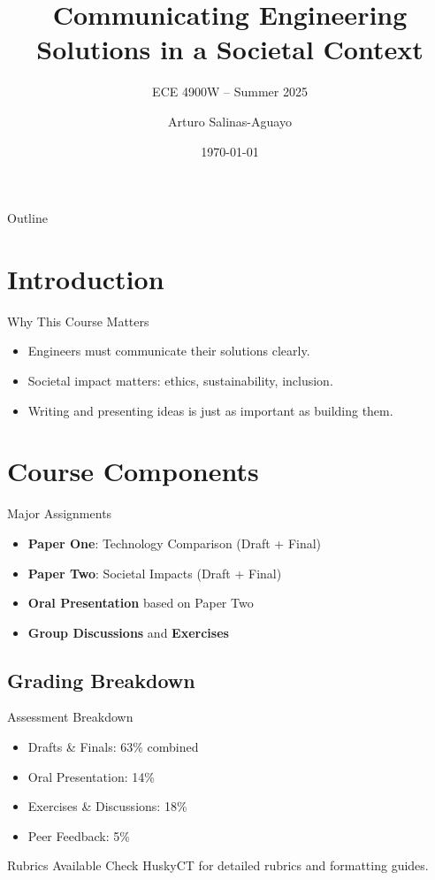 \documentclass{beamer}
\title[Engineering Communication]{Communicating Engineering Solutions in a Societal Context}
\subtitle{ECE 4900W – Summer 2025}
\author[Arturo Salinas]{Arturo Salinas-Aguayo}
\institute[UConn]{University of Connecticut\\College of Engineering}
\date{\today}
\begin{document}
\begin{frame}
	\titlepage
\end{frame}

\begin{frame}{Outline}
	\tableofcontents[pausesections]
\end{frame}

\section{Introduction}

\begin{frame}{Why This Course Matters}
	\begin{itemize}
		\item Engineers must communicate their solutions clearly.
		\item Societal impact matters: ethics, sustainability, inclusion.
		\item Writing and presenting ideas is just as important as building them.
	\end{itemize}
\end{frame}

\section{Course Components}

\begin{frame}{Major Assignments}
	\begin{itemize}
		\item \textbf{Paper One}: Technology Comparison (Draft + Final)
		\item \textbf{Paper Two}: Societal Impacts (Draft + Final)
		\item \textbf{Oral Presentation} based on Paper Two
		\item \textbf{Group Discussions} and \textbf{Exercises}
	\end{itemize}
\end{frame}

\subsection{Grading Breakdown}
\begin{frame}{Assessment Breakdown}
	\begin{itemize}
		\item Drafts \& Finals: \alert{63\%} combined
		\item Oral Presentation: \alert{14\%}
		\item Exercises \& Discussions: \alert{18\%}
		\item Peer Feedback: \alert{5\%}
	\end{itemize}
	\vfill
	\begin{block}{Rubrics Available}
		Check HuskyCT for detailed rubrics and formatting guides.
	\end{block}
\end{frame}
\end{document}
